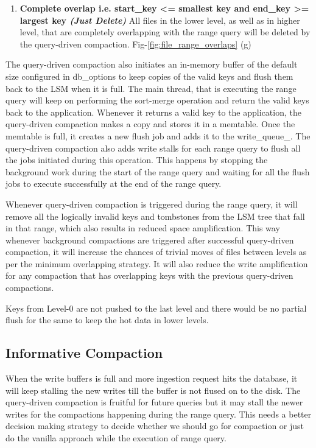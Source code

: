 \begin{enumerate}
    \item \textbf{Complete overlap i.e. start\_key <= smallest key and end\_key >= largest key 
    \textit{(Just Delete)}} All files in the lower level, as well as in higher level, that are completely overlapping 
    with the range query will be deleted by the query-driven compaction. Fig-\ref{fig:file_range_overlaps} (g)
\end{enumerate}
The query-driven compaction also initiates an in-memory buffer of the default size configured in db\_options to keep 
copies of the valid keys and flush them back to the LSM when it is full. The main thread, that is executing the range 
query will keep on performing the sort-merge operation and return the valid keys back to the application. Whenever it 
returns a valid key to the application, the query-driven compaction makes a copy and stores it in a memtable. Once the 
memtable is full, it creates a new flush job and adds it to the write\_queue\_. The query-driven compaction also adds 
write stalls for each range query to flush all the jobs initiated during this operation. This happens by stopping the 
background work during the start of the range query and waiting for all the flush jobs to execute successfully at the 
end of the range query.

Whenever query-driven compaction is triggered during the range query, it will remove all the logically invalid keys and 
tombstones from the LSM tree that fall in that range, which also results in reduced space amplification. This way 
whenever background compactions are triggered after successful query-driven compaction, it will increase the chances of 
trivial moves of files between levels as per  the minimum overlapping strategy. It will also reduce the write 
amplification for any compaction that has overlapping keys with the previous query-driven compactions.

Keys from Level-0 are not pushed to the last level and there would be no partial flush for the same to 
keep the hot data in lower levels.

\subsection{Informative Compaction}

When the write buffer\(s\) is full and more ingestion request hits the database, it will keep stalling the new writes 
till the buffer is not flused on to the disk. The query-driven compaction is fruitful for future queries but it may stall the 
newer writes for the compactions happening during the range query. This needs a better decision making
strategy to decide whether we should go for compaction or just do the vanilla approach while the execution of range query.

